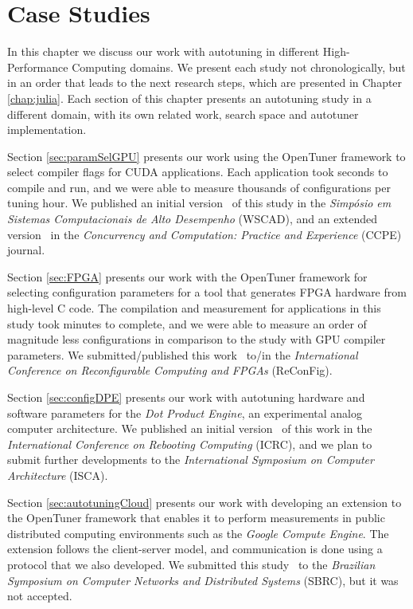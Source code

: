 \chapter{Case Studies}
\label{chap:usecases}

In this chapter we discuss our work with autotuning in different
High-Performance Computing domains. We present each study not chronologically,
but in an order that leads to the next research steps, which are presented in
Chapter \ref{chap:julia}. Each section of this chapter presents an autotuning
study in a different domain, with its own related work, search space and
autotuner implementation.

Section \ref{sec:paramSelGPU} presents our work using the OpenTuner framework
to select compiler flags for CUDA applications. Each application took seconds
to compile and run, and we were able to measure thousands of configurations per
tuning hour. We published an initial version~\cite{bruel2015autotuningGPU} of
this study in the \textit{Simpósio em Sistemas Computacionais de Alto
Desempenho} (WSCAD), and an extended version~\cite{bruel2017autotuning} in the
\textit{Concurrency and Computation: Practice and Experience} (CCPE) journal.

Section \ref{sec:FPGA} presents our work with the OpenTuner framework for
selecting configuration parameters for a tool that generates FPGA hardware from
high-level C code. The compilation and measurement for applications in this
study took minutes to complete, and we were able to measure an order of
magnitude less configurations in comparison to the study with GPU compiler
parameters. We submitted/published this work~\cite{} to/in the
\textit{International Conference on Reconfigurable Computing and FPGAs}
(ReConFig).

Section \ref{sec:configDPE} presents our work with autotuning hardware and
software parameters for the \textit{Dot Product Engine}, an experimental analog
computer architecture. We published an initial version~\cite{} of this work in
the \textit{International Conference on Rebooting Computing} (ICRC), and we
plan to submit further developments to the \textit{International Symposium on
Computer Architecture} (ISCA).  

Section \ref{sec:autotuningCloud} presents our work with developing an
extension to the OpenTuner framework that enables it to perform measurements in
public distributed computing environments such as the \textit{Google Compute
Engine}. The extension follows the client-server model, and communication is
done using a protocol that we also developed. We submitted this
study~\cite{bruel2016new} to the \textit{Brazilian Symposium on Computer
Networks and Distributed Systems} (SBRC), but it was not accepted.
